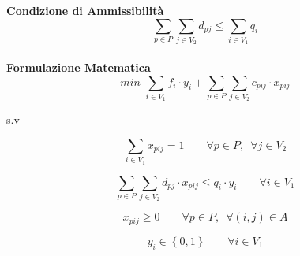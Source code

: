 \documentclass[a4paper,12pt,titlepage]{article}
\begin{document}
\newpage


\textbf{Condizione di Ammissibilità}\\
\begin{equation*}
	\sum_{p\in P}\sum_{j\in V_2} d_{pj} \leq \sum_{i\in V_1} q_i 
\end{equation*}
\\
\textbf{Formulazione Matematica}\\
\begin{equation}
	min\,\, \sum_{i\in V_1} f_i \cdot y_i + \sum_{p\in P}\sum_{j\in V_2} c_{pij} \cdot x_{pij}
	\tag{1}
\end{equation}
\begin{center}
	s.v
\end{center}
\begin{equation}
	\sum_{i\in V_1} x_{pij} = 1 \qquad \forall p \in P,\,\,\, \forall j \in V_2
	\tag{2}
\end{equation}

\begin{equation}
	\sum_{p\in P}\sum_{j\in V_2} d_{pj} \cdot x_{pij} \leq q_i \cdot y_i \qquad \forall i \in V_1
	\tag{3}
\end{equation}

\begin{equation}
	x_{pij}\geq 0 \qquad \forall p \in P,\,\,\,\forall (i,j)\in A
	\tag{4}
\end{equation}

\begin{equation}
	y_i \in \left\lbrace 0,1\right\rbrace  \qquad \forall i \in V_1
	\tag{5}
\end{equation}
\end{document}
